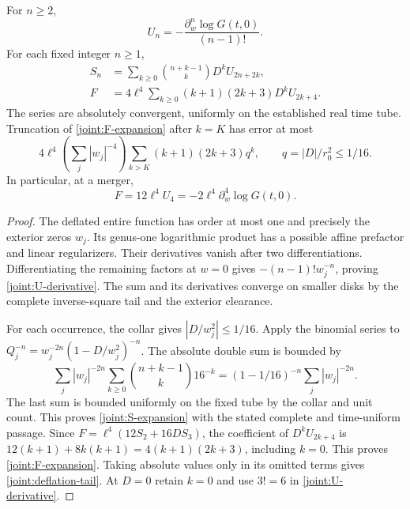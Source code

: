 \begin{proposition}\label{joint:deflation-prop}
For $n\ge2$,
\begin{equation}
 U_n=-\frac{\partial_w^n\log G(t,0)}{(n-1)!}.
 \label{joint:U-derivative}
\end{equation}
For each fixed integer $n\ge1$,
\begin{align}
 S_n&=\sum_{k\ge0}\binom{n+k-1}{k}D^kU_{2n+2k},
       \label{joint:S-expansion}\\
 F&=4\ell^4\sum_{k\ge0}(k+1)(2k+3)D^kU_{2k+4}.
       \label{joint:F-expansion}
\end{align}
The series are absolutely convergent, uniformly on the established real
time tube. Truncation of \eqref{joint:F-expansion} after $k=K$ has error
at most
\begin{equation}
 4\ell^4\left(\sum_j|w_j|^{-4}\right)
       \sum_{k>K}(k+1)(2k+3)q^k,
 \qquad q=|D|/r_0^2\le1/16.
 \label{joint:deflation-tail}
\end{equation}
In particular, at a merger,
\begin{equation}
 F=12\ell^4U_4=-2\ell^4\partial_w^4\log G(t,0).
 \label{joint:merger-derivative}
\end{equation}
\end{proposition}

\begin{proof}
The deflated entire function has order at most one and precisely the
exterior zeros $w_j$. Its genus-one logarithmic product has a possible
affine prefactor and linear regularizers. Their derivatives vanish after
two differentiations. Differentiating the remaining factors at $w=0$
gives $-(n-1)!w_j^{-n}$, proving \eqref{joint:U-derivative}.
The sum and its derivatives converge on smaller disks by the complete
inverse-square tail and the exterior clearance.

For each occurrence, the collar gives $|D/w_j^2|\le1/16$. Apply the
binomial series to
$Q_j^{-n}=w_j^{-2n}(1-D/w_j^2)^{-n}$.
The absolute double sum is bounded by
\[
 \sum_j|w_j|^{-2n}
       \sum_{k\ge0}\binom{n+k-1}{k}16^{-k}
   =(1-1/16)^{-n}\sum_j|w_j|^{-2n}.
\]
The last sum is bounded uniformly on the fixed tube by the collar and
unit count. This proves \eqref{joint:S-expansion} with the stated
complete and time-uniform passage. Since
$F=\ell^4(12S_2+16DS_3)$, the coefficient of $D^kU_{2k+4}$ is
$12(k+1)+8k(k+1)=4(k+1)(2k+3)$, including $k=0$.
This proves \eqref{joint:F-expansion}. Taking absolute values only in
its omitted terms gives \eqref{joint:deflation-tail}. At $D=0$ retain
$k=0$ and use $3!=6$ in \eqref{joint:U-derivative}.
\end{proof}

